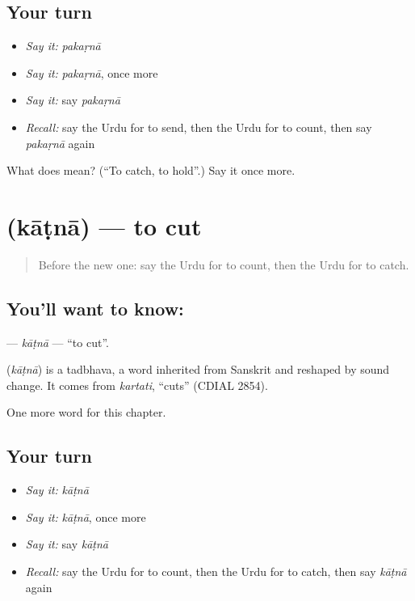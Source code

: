 \subsection*{Your turn}
\begin{itemize}
\raggedright
  \item \emph{Say it:} \emph{pakaṛnā}
  \item \emph{Say it:} \emph{pakaṛnā}, once more
  \item \emph{Say it:} say \emph{pakaṛnā}
  \item \emph{Recall:} say the Urdu for to send, then the Urdu for to count, then say \emph{pakaṛnā} again
\end{itemize}

\begin{tcolorbox}[breakable,colback=teal!4,colframe=teal!35!black,title={Before you move on}]
What does  mean? (\textquotedblleft{}To catch, to hold\textquotedblright{}.) Say it once more.
\end{tcolorbox}
\section[\texorpdfstring{\ur{کاٹنا} (kāṭnā)}{کاٹنا (kāṭnā)}]{ (kāṭnā) — to cut}

\label{lesson:UR-C52-katna}



\begin{quote}
Before the new one: say the Urdu for to count, then the Urdu for to catch.
\end{quote}

\subsection*{You'll want to know: }
\textbf{} — \emph{kāṭnā} — \textquotedblleft{}to cut\textquotedblright{}.

\begin{cousinweb}
\textbf{} (\emph{kāṭnā}) is a tadbhava, a word inherited from Sanskrit and reshaped by sound change. It comes from \emph{kartati}, \textquotedblleft{}cuts\textquotedblright{} (CDIAL 2854).
\end{cousinweb}

\begin{grammarlens}[title={What you've built}]
One more word for this chapter.
\end{grammarlens}

\subsection*{Your turn}
\begin{itemize}
\raggedright
  \item \emph{Say it:} \emph{kāṭnā}
  \item \emph{Say it:} \emph{kāṭnā}, once more
  \item \emph{Say it:} say \emph{kāṭnā}
  \item \emph{Recall:} say the Urdu for to count, then the Urdu for to catch, then say \emph{kāṭnā} again
\end{itemize}

